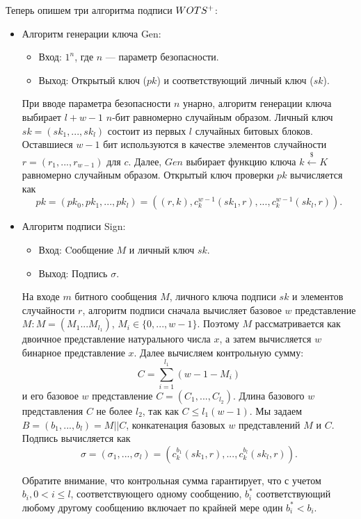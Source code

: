 \documentclass[a4paper, 14pt]{extarticle}
\begin{document}
Теперь опишем три алгоритма подписи $W\-OTS^{+}$:

\begin{itemize}
    \item Алгоритм генерации ключа Gen:

    \begin{itemize}
        \item Вход: $1^{n}$, где $n$ --- параметр безопасности.
        \item Выход: Открытый ключ ($pk$) и соответствующий личный ключ ($sk$).
    \end{itemize}

    При вводе параметра безопасности $n$ унарно, алгоритм генерации ключа выбирает $l + w - 1$ $n$-бит равномерно случайным образом. Личный ключ $sk = (sk_{1}, ..., sk_{l})$ состоит из первых $l$ случайных битовых блоков. Оставшиеся $w - 1$ бит используются в качестве элементов случайности $r = (r_{1}, ..., r_{w - 1})$ для $c$. Далее, $Gen$ выбирает функцию ключа $k \stackrel{\$}\leftarrow K$ равномерно случайным образом. Открытый ключ проверки $pk$ вычисляется как
    \[ pk = (pk_{0}, pk_{1}, ..., pk_{l}) = ((r, k),c^{w - 1}_{k}(sk_{1},r), ..., c^{w - 1}_{k}(sk_{l}, r)). \]

    \item Алгоритм подписи Sign:

    \begin{itemize}
        \item Вход: Cообщение $M$ и личный ключ $sk$.
        \item Выход: Подпись $\sigma$.
    \end{itemize}

    На входе $m$ битного сообщения $M$, личного ключа подписи $sk$ и элементов случайности $r$, алгоритм подписи сначала вычисляет базовое $w$ представление $M: M = (M_{1} . . . M_{l_{1}} )$, $M_{i} \in \{0, ..., w - 1\}$. Поэтому $M$ рассматривается как двоичное представление натурального числа $x$, а затем вычисляется $w$ бинарное представление $x$. Далее вычисляем контрольную сумму:
    \[ C = \sum^{l_{1}}_{i = 1}(w - 1 - M_{i}) \]
    и его базовое $w$ представление $C = (C_{1}, ..., C_{l_{2}})$. Длина базового $w$ представления $C$ не более $l_{2}$, так как $C \leq l_{1}(w - 1)$. Мы задаем $B = (b_{1}, ..., b_{l}) = M || C$, конкатенация базовых $w$ представлений $M$ и $C$. Подпись вычисляется как
    \[ \sigma = (\sigma_{1}, ..., \sigma_{l}) = (c^{b_{1}}_{k}(sk_{1},r), ..., c^{b_{l}}_{k}(sk_{l},r)). \]

    Обратите внимание, что контрольная сумма гарантирует, что с учетом $b_{i}, 0 < i \leq l$, соответствующего одному сообщению, $b^{*}_{i}$ соответствующий любому другому сообщению включает по крайней мере один $b^{*}_{i} < b_{i}$.


\end{itemize}
\end{document}

